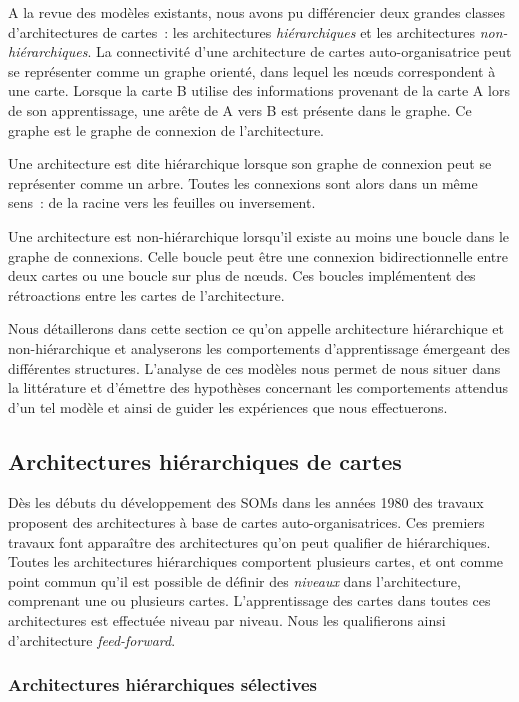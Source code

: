 \documentclass[../main]{subfiles}
\begin{document}
A la revue des modèles existants, nous avons pu différencier deux grandes classes d'architectures de cartes~: les architectures \emph{hiérarchiques} et  les architectures \emph{non-hiérarchiques}.
La connectivité d'une architecture de cartes auto-organisatrice peut se représenter comme un graphe orienté, dans lequel les n\oe{}uds correspondent à une carte. Lorsque la carte B utilise des informations provenant de la carte A lors de son apprentissage, une arête de A vers B est présente dans le graphe. Ce graphe est le graphe de connexion de l'architecture.

Une architecture est dite hiérarchique lorsque son graphe de connexion peut se représenter comme un arbre. Toutes les connexions sont alors dans un même sens~: de la racine vers les feuilles ou inversement.

Une architecture est non-hiérarchique lorsqu'il existe au moins une boucle dans le graphe de connexions. Celle boucle peut être une connexion bidirectionnelle entre deux cartes ou une boucle sur plus de n\oe{}uds. Ces boucles implémentent des rétroactions entre les cartes de l'architecture.

Nous détaillerons dans cette section ce qu'on appelle architecture hiérarchique et non-hiérarchique et analyserons les comportements d'apprentissage émergeant des différentes structures. L'analyse de ces modèles nous permet de nous situer dans la littérature et d'émettre des hypothèses concernant les comportements attendus d'un tel modèle et ainsi de guider les expériences que nous effectuerons.

\subsection{Architectures hiérarchiques de cartes}

Dès les débuts du développement des SOMs dans les années 1980 des travaux proposent des architectures à base de cartes auto-organisatrices. Ces premiers travaux font apparaître des architectures qu'on peut qualifier de hiérarchiques.
Toutes les architectures hiérarchiques comportent plusieurs cartes, et ont comme point commun qu'il est possible de définir des \emph{niveaux} dans l'architecture, comprenant une ou plusieurs cartes. L'apprentissage des cartes dans toutes ces architectures est effectuée niveau par niveau. Nous les qualifierons ainsi d'architecture \emph{feed-forward}. 

\subsubsection{Architectures hiérarchiques sélectives}
\end{document}
